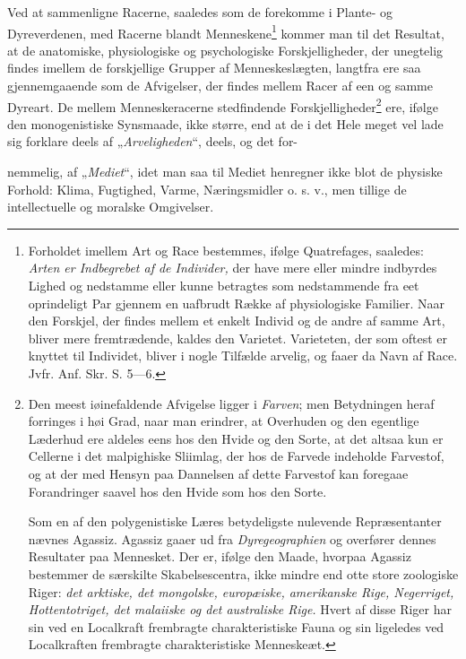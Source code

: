 \documentclass[12pt,a4paper]{book}
\begin{document}
\setcounter{footnote}{0}
Ved at sammenligne Racerne, saaledes som de forekomme i Plante- og
Dyreverdenen, med Racerne blandt Menneskene\footnote{Forholdet imellem Art og
Race bestemmes, ifølge Quatrefages, saaledes: \emph{Arten er Indbegrebet af de
Individer,} der have mere eller mindre indbyrdes Lighed og nedstamme eller kunne
betragtes som nedstammende fra eet oprindeligt Par gjennem en uafbrudt Række af
physiologiske Familier. Naar den Forskjel, der findes mellem et enkelt Individ
og de andre af samme Art, bliver mere fremtrædende, kaldes den Varietet.
Varieteten, der som oftest er knyttet til Individet, bliver i nogle Tilfælde
arvelig, og faaer da Navn af Race. Jvfr. Anf. Skr. S. 5---6.} kommer man til det
Resultat, at de anatomiske, physiologiske og psychologiske Forskjelligheder, der
unegtelig findes imellem de forskjellige Grupper af Menneskeslægten, langtfra
ere saa gjennemgaaende som de Afvigelser, der findes mellem Racer af een og
samme Dyreart. De mellem Menneskeracerne stedfindende
Forskjelligheder\footnote{Den meest iøinefaldende Afvigelse ligger i
\emph{Farven}; men Betydningen heraf forringes i høi Grad, naar man erindrer, at
Overhuden og den egentlige Læderhud ere aldeles eens hos den Hvide og den Sorte,
at det altsaa kun er Cellerne i det malpighiske Sliimlag, der hos de Farvede
indeholde Farvestof, og at der med Hensyn paa Dannelsen af dette Farvestof kan
foregaae Forandringer saavel hos den Hvide som hos den Sorte.

Som en af den polygenistiske Læres betydeligste nulevende Repræsentanter nævnes
Agassiz. Agassiz gaaer ud fra \emph{Dyregeographien} og overfører dennes
Resultater paa Mennesket. Der er, ifølge den Maade, hvorpaa Agassiz bestemmer de
særskilte Skabelsescentra, ikke mindre end otte store zoologiske Riger:
\emph{det arktiske, det mongolske, europæiske, amerikanske Rige, Negerriget,
Hottentotriget, det malaiiske og det australiske Rige.} Hvert af disse Riger har
sin ved en Localkraft frembragte charakteristiske Fauna og sin ligeledes ved
Localkraften frembragte charakteristiske Menneskeæt.} ere, ifølge den
monogenistiske Synsmaade, ikke større, end at de i det Hele meget vel lade sig
forklare deels af „\emph{Arveligheden}“, deels, og det for-

\setcounter{footnote}{0}
nemmelig, af „\emph{Mediet}“, idet man saa til Mediet henregner ikke blot de
physiske Forhold: Klima, Fugtighed, Varme, Næringsmidler o. s. v., men tillige
de intellectuelle og moralske Omgivelser.
\end{document}
